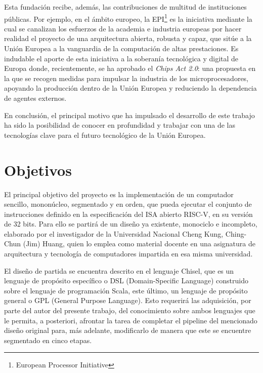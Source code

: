 Esta fundación recibe, además, las contribuciones de multitud de instituciones públicas. Por ejemplo, en el ámbito europeo, la EPI\footnote{European Processor Initiative} es la iniciativa mediante la cual se canalizan los esfuerzos de la academia e industria europeas por hacer realidad el proyecto de una arquitectura abierta, robusta y capaz, que sitúe a la Unión Europea a la vanguardia de la computación de altas prestaciones. Es indudable el aporte de esta iniciativa a la soberanía tecnológica y digital de Europa donde, recientemente, se ha aprobado el \textit{Chips Act 2.0}\cite{chips-act}: una propuesta en la que se recogen medidas para impulsar la industria de los microprocesadores, apoyando la producción dentro de la Unión Europea y reduciendo la dependencia de agentes externos.

En conclusión, el principal motivo que ha impulsado el desarrollo de este trabajo ha sido la posibilidad de conocer en profundidad y trabajar con una de las tecnologías clave para el futuro tecnológico de la Unión Europea.


\section{Objetivos}

El principal objetivo del proyecto es la implementación de un computador sencillo, mononúcleo, segmentado y en orden, que pueda ejecutar el conjunto de instrucciones definido en la especificación del ISA abierto RISC-V, en su versión de 32 bits. Para ello se partirá de un diseño ya existente, monociclo e incompleto, elaborado por el investigador de la Universidad Nacional Cheng Kung, Ching-Chun (Jim) Huang, quien lo emplea como material docente en una asignatura de arquitectura y tecnología de computadores impartida en esa misma universidad.

El diseño de partida se encuentra descrito en el lenguaje Chisel, que es un lenguaje de propósito específico o DSL (Domain-Specific Language) construido sobre el lenguaje de programación Scala, este último, un lenguaje de propósito general o GPL (General Purpose Language). Esto requerirá las adquisición, por parte del autor del presente trabajo, del conocimiento sobre ambos lenguajes que le permita, a posteriori, afrontar la tarea de completar el pipeline del mencionado diseño original para, más adelante, modificarlo de manera que este se encuentre segmentado en cinco etapas.

